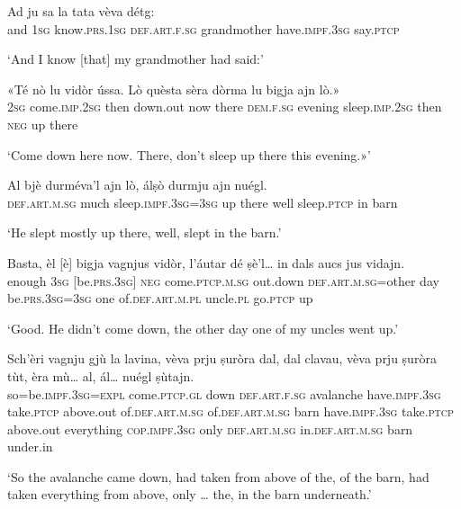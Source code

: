 \begin{linenumbers}
\gll  Ad ju sa la tata vèva détg:   \\
 and \textsc{1sg} know.\textsc{prs.1sg} \textsc{def.art.f.sg} grandmother have.\textsc{impf.3sg} say.\textsc{ptcp}  \\
\end{linenumbers}
\medskip
\glt `And I know [that] my grandmother had said:'
\medskip

\begin{linenumbers}
\gll «Té nò lu vidòr ússa. Lò quèsta sèra dòrma lu bigja ajn lò.»   \\
 \textsc{2sg} come.\textsc{imp.2sg} then down.out now there  \textsc{dem.f.sg} evening sleep.\textsc{imp.2sg} then \textsc{neg} up there  \\
\end{linenumbers}
\medskip
\glt `Come down here now. There, don’t sleep up there this evening.»'
\medskip

\begin{linenumbers}
\gll  Al bjè durméva’l ajn lò, álṣò durmju ajn nuégl.\\
 \textsc{def.art.m.sg} much sleep.\textsc{impf.3sg=3sg} up there well sleep.\textsc{ptcp} in barn   \\
\end{linenumbers}
\medskip
\glt `He slept mostly up there, well, slept in the barn.'
\medskip

\begin{linenumbers}
\gll  Basta, èl [è] bigja vagnjus vidòr, l’áutar dé ṣè’l… in dals aucs jus vidajn.  \\
 enough \textsc{3sg} [be.\textsc{prs.3sg}] \textsc{neg} come.\textsc{ptcp.m.sg} out.down \textsc{def.art.m.sg}=other day be.\textsc{prs.3sg=3sg} one of.\textsc{def.art.m.pl} uncle.\textsc{pl} go.\textsc{ptcp} up  \\
\end{linenumbers}
\medskip
\glt `Good. He didn’t come down, the other day one of my uncles went up.'
\medskip

\begin{linenumbers}
\gll Sch’èri vagnju gjù la lavina, vèva prju ṣuròra dal, dal clavau, vèva prju ṣuròra tùt, èra mù… al, ál… nuégl ṣùtajn. \\
so=be.\textsc{impf.3sg=expl} come.\textsc{ptcp.gl} down \textsc{def.art.f.sg} avalanche have.\textsc{impf.3sg} take.\textsc{ptcp} above.out of.\textsc{def.art.m.sg} of.\textsc{def.art.m.sg} barn have.\textsc{impf.3sg} take.\textsc{ptcp} above.out everything \textsc{cop.impf.3sg} only \textsc{def.art.m.sg} in.\textsc{def.art.m.sg} barn under.in \\
\end{linenumbers}
\medskip
\glt `So the avalanche came down, had taken from above of the, of the barn, had taken everything from above, only … the, in the barn underneath.'
\medskip

